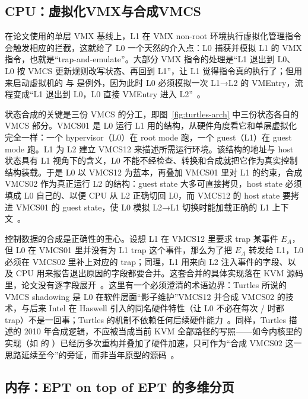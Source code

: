 \subsection{CPU：虚拟化VMX与合成VMCS}\label{sec:nested-cpu}

在论文使用的单层 VMX 基线上，L1 在 VMX non-root 环境执行虚拟化管理指令会触发相应的拦截，这就给了 L0 一个天然的介入点：L0 捕获并模拟 L1 的 VMX 指令，也就是“trap-and-emulate”。大部分 VMX 指令的处理是“L1 退出到 L0、L0 按 VMCS 更新规则改写状态、再回到 L1”，让 L1 觉得指令真的执行了；但用来启动虚拟机的  与  是例外，因为此时 L0 必须模拟一次 L1→L2 的 VMEntry，流程变成“L1 退出到 L0，L0 直接 VMEntry 进入 L2”~\cite{source7}。

状态合成的关键是三份 VMCS 的分工，即图~\ref{fig:turtles-arch} 中三份状态各自的 VMCS 部分。VMCS01 是 L0 运行 L1 用的结构，从硬件角度看它和单层虚拟化完全一样：一个 hypervisor（L0）在 root mode 跑，一个 guest（L1）在 guest mode 跑。L1 为 L2 建立 VMCS12 来描述所需运行环境。该结构的地址与 host 状态具有 L1 视角下的含义，L0 不能不经检查、转换和合成就把它作为真实控制结构装载。于是 L0 以 VMCS12 为蓝本，再叠加 VMCS01 里对 L1 的约束，合成 VMCS02 作为真正运行 L2 的结构：guest state 大多可直接拷贝，host state 必须填成 L0 自己的、以便 CPU 从 L2 正确切回 L0，而 VMCS12 的 host state 要拷进 VMCS01 的 guest state，使 L0 模拟 L2→L1 切换时能加载正确的 L1 上下文~\cite{source7}。

控制数据的合成是正确性的重心。设想 L1 在 VMCS12 里要求 trap 某事件 $E_A$，但 L0 在 VMCS01 里并没有为 L1 trap 这个事件，那么为了把 $E_A$ 转发给 L1，L0 必须在 VMCS02 里补上对应的 trap；同理，L1 用来向 L2 注入事件的字段、以及 CPU 用来报告退出原因的字段都要合并。这套合并的具体实现落在 KVM 源码里，论文没有逐字段展开~\cite{source7}。这里有一个必须澄清的术语边界：Turtles 所说的 VMCS shadowing 是 L0 在软件层面“影子维护”VMCS12 并合成 VMCS02 的技术，与后来 Intel 在 Haswell 引入的同名硬件特性（让 L0 不必在每次 / 时都 trap）不是一回事；Turtles 的机制不依赖任何后续硬件能力~\cite{source7,source8}。同样，Turtles 描述的 2010 年合成逻辑，不应被当成当前 KVM 全部路径的写照——如今内核里的实现（如  的 ）已经历多次重构并叠加了硬件加速，只可作为“合成 VMCS02 这一思路延续至今”的旁证，而非当年原型的源码~\cite{source5}。

\subsection{内存：EPT on top of EPT 的多维分页}\label{sec:nested-mem}

